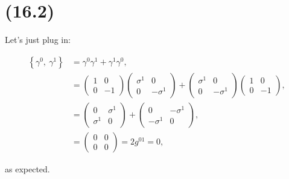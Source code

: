 
\section{(16.2)}


Let's just plug in:

\begin{align*}
    \left\{\gamma^0,\ \gamma^1\right\} &= \gamma^0\gamma^1 + \gamma^1\gamma^0, \\
    &= \begin{pmatrix}1 & 0 \\ 0 & -1\end{pmatrix}\begin{pmatrix}\sigma^1 & 0 \\ 0 & -\sigma^1\end{pmatrix} + \begin{pmatrix}\sigma^1 & 0 \\ 0 & -\sigma^1\end{pmatrix}\begin{pmatrix}1 & 0 \\ 0 & -1\end{pmatrix}, \\ 
    &= \begin{pmatrix}0 & \sigma^1 \\ \sigma^1 & 0\end{pmatrix} + \begin{pmatrix}0 & -\sigma^1 \\ -\sigma^1 & 0\end{pmatrix}, \\ 
    &= \begin{pmatrix}0 & 0 \\ 0 & 0\end{pmatrix} = 2g^{01} = 0,
\end{align*}

as expected.